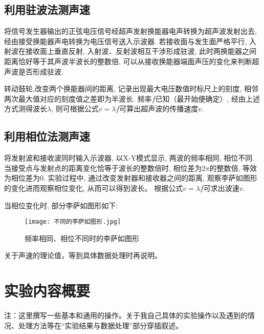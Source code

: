 \documentclass[11pt]{article}
\begin{document}
\subsection{利用驻波法测声速}

将信号发生器输出的正弦电压信号经超声发射换能器电声转换为超声波发射出去,
 经由接受换能器声电转换为电压信号送入示波器. 
 若接收面与发生面严格平行, 入射波在接收面上垂直反射, 
 入射波、反射波相互干涉形成驻波, 
 此时两换能器之间距离恰好等于其声波半波长的整数倍,
可以从接收换能器端面声压的变化来判断超声波是否形成驻波. 

转动鼓轮,改变两个换能器间的距离, 
记录出现最大电压数值时标尺上的刻度, 
相邻两次最大值对应的刻度值之差即为半波长. 
频率$f$已知（最开始便确定）, 经由上述方式测得波长$\lambda$, 
则可根据公式$v = \lambda f$可算出超声波的传播速度$v$. 

\subsection{利用相位法测声速}

将发射波和接收波同时输入示波器, 以X-Y模式显示, 
两波的频率相同, 相位不同. 
当接受点与发射点的距离变化恰等于波长的整数倍时, 
相位差为$2\pi$的整数倍, 等效为相位差为$0$. 
实验过程中, 通过改变发射器和接收器之间的距离, 
观察李萨如图形的变化进而观察相位变化, 从而可以得到波长。
根据公式$v = \lambda f$可求出波速$v$. 

当相位变化时, 部分李萨如图形如下: 

\begin{figure}[htbp]
    \centering
    \texttt{[image: 不同的李萨如图形.jpg]}
    \caption{频率相同、相位不同时的李萨如图形}
\end{figure}

关于声速的理论值，等到具体数据处理时再说明。



































\section{实验内容概要}
\begin{kaishu}
    注：这里撰写一些基本和通用的操作。关于我自己具体的实验操作以及遇到的情况、处理方法等在“实验结果与数据处理”部分穿插叙述。
\end{kaishu}
\end{document}
